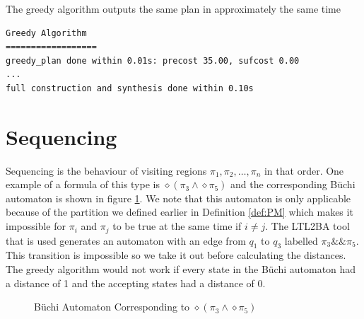 The greedy algorithm outputs the same plan in approximately the same time
\begingroup
\fontsize{9pt}{12pt}\selectfont
\begin{lstlisting}
Greedy Algorithm
==================
greedy_plan done within 0.01s: precost 35.00, sufcost 0.00
...
full construction and synthesis done within 0.10s 
\end{lstlisting}
\endgroup

\section{Sequencing}
Sequencing is the behaviour of visiting regions $\pi_1,\pi_2,\dots,\pi_n$ in that order. One example of a formula of this type is $\diamond (\pi_3 \land  \diamond \pi_5)$ and the corresponding B\"uchi automaton is shown in figure \ref{fig:seq}. We note that this automaton is only applicable because of the partition we defined earlier in Definition \ref{def:PM} which makes it impossible for $\pi_i$ and $\pi_j$ to be true at the same time if $i\neq j$. The LTL2BA tool \cite{ltlbuchiwebsite} that is used generates an automaton with an edge from $q_1$ to $q_3$ labelled $\pi_3 \&\& \pi_5 $. This transition is impossible so we take it out before calculating the distances. The greedy algorithm would not work if every state in the B\"uchi automaton had a distance of 1 and the accepting states had a distance of 0.


\begin{figure}
\centering
{}
\caption{B\"uchi Automaton Corresponding to $  \diamond(\pi_3 \land \diamond \pi_5)$}
\label{fig:seq}
\end{figure}

